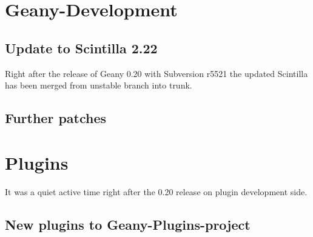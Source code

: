 \documentclass[%
paper=a4,%
fontsize=11pt,%
twoside=false,%
DIV18,
headsepline,
plainheadsepline,
footsepline,
plainfootsepline,
parskip=half,%
openany,%
]{scrartcl}
\begin{document}
\section{Geany-Development}
\subsection{Update to Scintilla 2.22}

Right after the release of Geany 0.20 with Subversion r5521 the
updated Scintilla has been merged from unstable branch into trunk.

\subsection{Further patches}

\section{Plugins}

It was a quiet active time right after the 0.20 release on plugin
development side.


\subsection{New plugins to Geany-Plugins-project}
\end{document}
